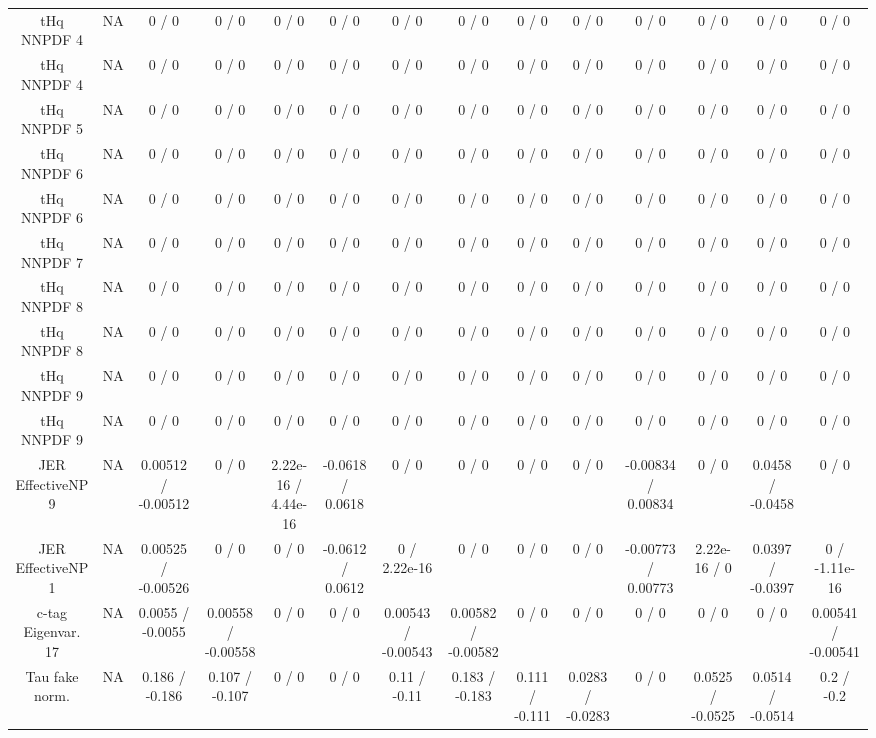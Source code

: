 \documentclass[10pt]{article}
\begin{document}
\begin{table}[htbp]
\begin{center}
\begin{tabular}{|c|c|c|c|c|c|c|c|c|c|c|c|c|c|}
  tHq NNPDF 4 &    NA    & 0 / 0 & 0 / 0 & 0 / 0 & 0 / 0 & 0 / 0 & 0 / 0 & 0 / 0 & 0 / 0 & 0 / 0 & 0 / 0 & 0 / 0 & 0 / 0 \\ 
  tHq NNPDF 4 &    NA    & 0 / 0 & 0 / 0 & 0 / 0 & 0 / 0 & 0 / 0 & 0 / 0 & 0 / 0 & 0 / 0 & 0 / 0 & 0 / 0 & 0 / 0 & 0 / 0 \\ 
  tHq NNPDF 5 &    NA    & 0 / 0 & 0 / 0 & 0 / 0 & 0 / 0 & 0 / 0 & 0 / 0 & 0 / 0 & 0 / 0 & 0 / 0 & 0 / 0 & 0 / 0 & 0 / 0 \\ 
  tHq NNPDF 6 &    NA    & 0 / 0 & 0 / 0 & 0 / 0 & 0 / 0 & 0 / 0 & 0 / 0 & 0 / 0 & 0 / 0 & 0 / 0 & 0 / 0 & 0 / 0 & 0 / 0 \\ 
  tHq NNPDF 6 &    NA    & 0 / 0 & 0 / 0 & 0 / 0 & 0 / 0 & 0 / 0 & 0 / 0 & 0 / 0 & 0 / 0 & 0 / 0 & 0 / 0 & 0 / 0 & 0 / 0 \\ 
  tHq NNPDF 7 &    NA    & 0 / 0 & 0 / 0 & 0 / 0 & 0 / 0 & 0 / 0 & 0 / 0 & 0 / 0 & 0 / 0 & 0 / 0 & 0 / 0 & 0 / 0 & 0 / 0 \\ 
  tHq NNPDF 8 &    NA    & 0 / 0 & 0 / 0 & 0 / 0 & 0 / 0 & 0 / 0 & 0 / 0 & 0 / 0 & 0 / 0 & 0 / 0 & 0 / 0 & 0 / 0 & 0 / 0 \\ 
  tHq NNPDF 8 &    NA    & 0 / 0 & 0 / 0 & 0 / 0 & 0 / 0 & 0 / 0 & 0 / 0 & 0 / 0 & 0 / 0 & 0 / 0 & 0 / 0 & 0 / 0 & 0 / 0 \\ 
  tHq NNPDF 9 &    NA    & 0 / 0 & 0 / 0 & 0 / 0 & 0 / 0 & 0 / 0 & 0 / 0 & 0 / 0 & 0 / 0 & 0 / 0 & 0 / 0 & 0 / 0 & 0 / 0 \\ 
  tHq NNPDF 9 &    NA    & 0 / 0 & 0 / 0 & 0 / 0 & 0 / 0 & 0 / 0 & 0 / 0 & 0 / 0 & 0 / 0 & 0 / 0 & 0 / 0 & 0 / 0 & 0 / 0 \\ 
  JER EffectiveNP 9 &    NA    & 0.00512 / -0.00512 & 0 / 0 & 2.22e-16 / 4.44e-16 & -0.0618 / 0.0618 & 0 / 0 & 0 / 0 & 0 / 0 & 0 / 0 & -0.00834 / 0.00834 & 0 / 0 & 0.0458 / -0.0458 & 0 / 0 \\ 
  JER EffectiveNP 1 &    NA    & 0.00525 / -0.00526 & 0 / 0 & 0 / 0 & -0.0612 / 0.0612 & 0 / 2.22e-16 & 0 / 0 & 0 / 0 & 0 / 0 & -0.00773 / 0.00773 & 2.22e-16 / 0 & 0.0397 / -0.0397 & 0 / -1.11e-16 \\ 
  c-tag Eigenvar. 17 &    NA    & 0.0055 / -0.0055 & 0.00558 / -0.00558 & 0 / 0 & 0 / 0 & 0.00543 / -0.00543 & 0.00582 / -0.00582 & 0 / 0 & 0 / 0 & 0 / 0 & 0 / 0 & 0 / 0 & 0.00541 / -0.00541 \\ 
  Tau fake norm. &    NA    & 0.186 / -0.186 & 0.107 / -0.107 & 0 / 0 & 0 / 0 & 0.11 / -0.11 & 0.183 / -0.183 & 0.111 / -0.111 & 0.0283 / -0.0283 & 0 / 0 & 0.0525 / -0.0525 & 0.0514 / -0.0514 & 0.2 / -0.2 \\ 

\end{tabular}
\end{center}
\end{table}
\end{document}
